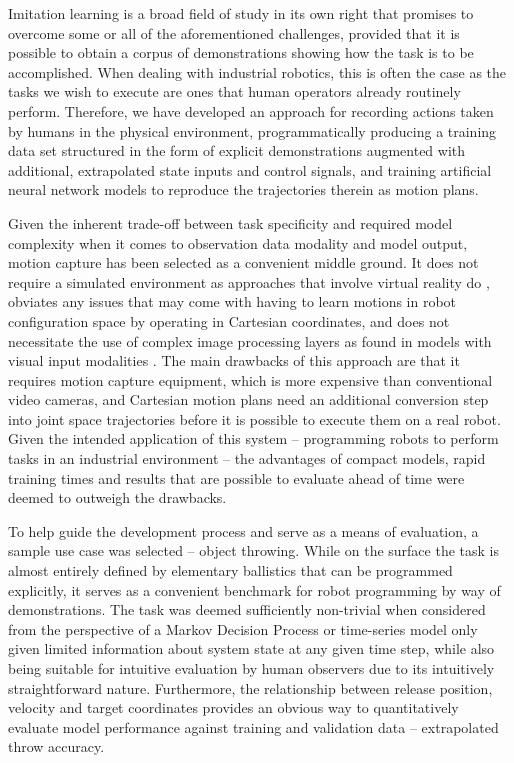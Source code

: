 \documentclass{article}
\begin{document}
Imitation learning is a broad field of study in its own right that promises to overcome some or all of the aforementioned challenges, provided that it is possible to obtain a corpus of demonstrations showing how the task is to be accomplished. When dealing with industrial robotics, this is often the case as the tasks we wish to execute are ones that human operators already routinely perform. Therefore, we have developed an approach for recording actions taken by humans in the physical environment, programmatically producing a training data set structured in the form of explicit demonstrations augmented with additional, extrapolated state inputs and control signals, and training artificial neural network models to reproduce the trajectories therein as motion plans.

Given the inherent trade-off between task specificity and required model complexity when it comes to observation data modality and model output, motion capture has been selected as a convenient middle ground. It does not require a simulated environment as approaches that involve virtual reality do \citep{zhang2018deep,dyrstad2018teaching}, obviates any issues that may come with having to learn motions in robot configuration space by operating in Cartesian coordinates, and does not necessitate the use of complex image processing layers as found in models with visual input modalities \citep{liu2018imitation, zhang2018deep}. The main drawbacks of this approach are that it requires motion capture equipment, which is more expensive than conventional video cameras, and Cartesian motion plans need an additional conversion step into joint space trajectories before it is possible to execute them on a real robot. Given the intended application of this system -- programming robots to perform tasks in an industrial environment -- the advantages of compact models, rapid training times and results that are possible to evaluate ahead of time were deemed to outweigh the drawbacks.

To help guide the development process and serve as a means of evaluation, a sample use case was selected -- object throwing. While on the surface the task is almost entirely defined by elementary ballistics that can be programmed explicitly, it serves as a convenient benchmark for robot programming by way of demonstrations. The task was deemed sufficiently non-trivial when considered from the perspective of a Markov Decision Process or time-series model only given limited information about system state at any given time step, while also being suitable for intuitive evaluation by human observers due to its intuitively straightforward nature. Furthermore, the relationship between release position, velocity and target coordinates provides an obvious way to quantitatively evaluate model performance against training and validation data -- extrapolated throw accuracy.
\end{document}
